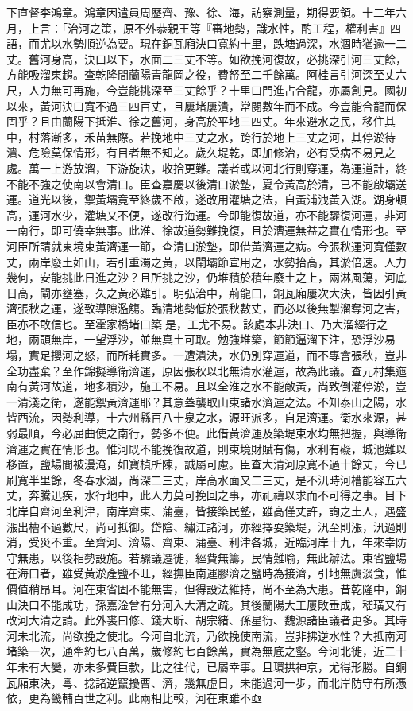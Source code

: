 \begin{pinyinscope}
下直督李鴻章。鴻章因遣員周歷齊、豫、徐、海，訪察測量，期得要領。十二年六月，上言：「治河之策，原不外恭親王等『審地勢，識水性，酌工程，權利害』四語，而尤以水勢順逆為要。現在銅瓦廂決口寬約十里，跌塘過深，水涸時猶逾一二丈。舊河身高，決口以下，水面二三丈不等。如欲挽河復故，必挑深引河三丈餘，方能吸溜東趨。查乾隆間蘭陽青龍岡之役，費帑至二千餘萬。阿桂言引河深至丈六尺，人力無可再施，今豈能挑深至三丈餘乎？十里口門進占合龍，亦屬創見。國初以來，黃河決口寬不過三四百丈，且屢堵屢潰，常閱數年而不成。今豈能合龍而保固乎？且由蘭陽下抵淮、徐之舊河，身高於平地三四丈。年來避水之民，移住其中，村落漸多，禾苗無際。若挽地中三丈之水，跨行於地上三丈之河，其停淤待潰、危險莫保情形，有目者無不知之。歲久堤乾，即加修治，必有受病不易見之處。萬一上游放溜，下游旋決，收拾更難。議者或以河北行則穿運，為運道計，終不能不強之使南以會清口。臣查嘉慶以後清口淤墊，夏令黃高於清，已不能啟壩送運。道光以後，禦黃壩竟至終歲不啟，遂改用灌塘之法，自黃浦洩黃入湖。湖身頓高，運河水少，灌塘又不便，遂改行海運。今即能復故道，亦不能驟復河運，非河一南行，即可僥幸無事。此淮、徐故道勢難挽復，且於漕運無益之實在情形也。至河臣所請就東境束黃濟運一節，查清口淤墊，即借黃濟運之病。今張秋運河寬僅數丈，兩岸廢土如山，若引重濁之黃，以閘壩節宣用之，水勢抬高，其淤倍速。人力幾何，安能挑此日進之沙？且所挑之沙，仍堆積於積年廢土之上，兩淋風蕩，河底日高，閘亦壅塞，久之黃必難引。明弘治中，荊龍口，銅瓦廂屢次大決，皆因引黃濟張秋之運，遂致導隙濫觴。臨清地勢低於張秋數丈，而必以後無掣溜奪河之害，臣亦不敢信也。至霍家橋堵口築是，工尤不易。該處本非決口、乃大溜經行之地，兩頭無岸，一望浮沙，並無真土可取。勉強堆築，節節逼溜下注，恐浮沙易塌，實足攖河之怒，而所耗實多。一遭潰決，水仍別穿運道，而不專會張秋，豈非全功盡棄？至作錦擬導衛濟運，原因張秋以北無清水灌運，故為此議。查元村集迤南有黃河故道，地多積沙，施工不易。且以全淮之水不能敵黃，尚致倒灌停淤，豈一清淺之衛，遂能禦黃濟運耶？其意蓋襲取山東諸水濟運之法。不知泰山之陽，水皆西流，因勢利導，十六州縣百八十泉之水，源旺派多，自足濟運。衛水來源，甚弱最順，今必屈曲使之南行，勢多不便。此借黃濟運及築堤束水均無把握，與導衛濟運之實在情形也。惟河既不能挽復故道，則東境財賦有傷，水利有礙，城池難以移置，鹽場間被漫淹，如寶楨所陳，誠屬可慮。臣查大清河原寬不過十餘丈，今已刷寬半里餘，冬春水涸，尚深二三丈，岸高水面又二三丈，是不汛時河槽能容五六丈，奔騰迅疾，水行地中，此人力莫可挽回之事，亦祀禱以求而不可得之事。目下北岸自齊河至利津，南岸齊東、蒲臺，皆接築民墊，雖高僅丈許，詢之土人，遇盛漲出槽不過數尺，尚可抵御。岱陰、繡江諸河，亦經擇耍築堤，汛至則漲，汛過則消，受災不重。至齊河、濟陽、齊東、蒲臺、利津各城，近臨河岸十九，年來幸防守無患，以後相勢設施。若驟議遷徙，經費無籌，民情難喻，無此辦法。東省鹽場在海口者，雖受黃淤產鹽不旺，經撫臣南運膠濟之鹽時為接濟，引地無虞淡食，惟價值稍昂耳。河在東省固不能無害，但得設法維持，尚不至為大患。昔乾隆中，銅山決口不能成功，孫嘉淦曾有分河入大清之疏。其後蘭陽大工屢敗垂成，嵇璜又有改河大清之請。此外裘曰修、錢大昕、胡宗緒、孫星衍、魏源諸臣議者更多。其時河未北流，尚欲挽之使北。今河自北流，乃欲挽使南流，豈非拂逆水性？大抵南河堵築一次，通牽約七八百萬，歲修約七百餘萬，實為無底之壑。今河北徙，近二十年未有大變，亦未多費巨款，比之往代，已屬幸事。且環拱神京，尤得形勝。自銅瓦廂東決，粵、捻諸逆竄擾曹、濟，幾無虛日，未能過河一步，而北岸防守有所憑依，更為畿輔百世之利。此兩相比較，河在東雖不亟
\end{pinyinscope}
